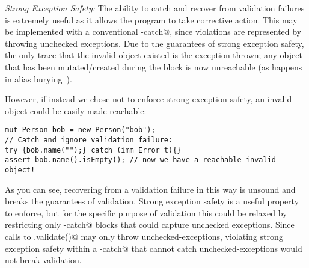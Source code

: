 %
%

\loseSpace
\noindent\textit{Strong Exception Safety:}
The ability to catch and recover from validation failures is extremely useful as it allows the program to take corrective action.
This may be implemented with a conventional \Q@try-catch@, since violations are represented by throwing unchecked exceptions. Due to the guarantees of strong exception safety, the only trace that the invalid object existed is the exception thrown; any object that has been mutated/created during the \Q@try@ block is now unreachable (as happens in alias burying~\cite{boyland2001alias}).

However, if instead we chose not to enforce strong exception safety, an invalid object could be easily made reachable:
\saveSpace
\begin{lstlisting}[morekeywords={assert}, escapechar=\%]
mut Person bob = new Person("bob");
// Catch and ignore validation failure:
try {bob.name("");} catch (imm Error t){}
assert bob.name().isEmpty(); // now we have a reachable invalid object!
\end{lstlisting}
\saveSpace
As you can see, recovering from a validation failure in this way is unsound and breaks the guarantees of validation.
Strong exception safety is a useful property to enforce, but for the specific purpose of validation this could be relaxed by restricting only \Q@try-catch@ blocks that could capture unchecked exceptions.
Since calls to \Q@.validate()@ may only throw unchecked-exceptions, violating strong exception safety within a \Q@try-catch@ that cannot catch unchecked-exceptions would not break validation.





